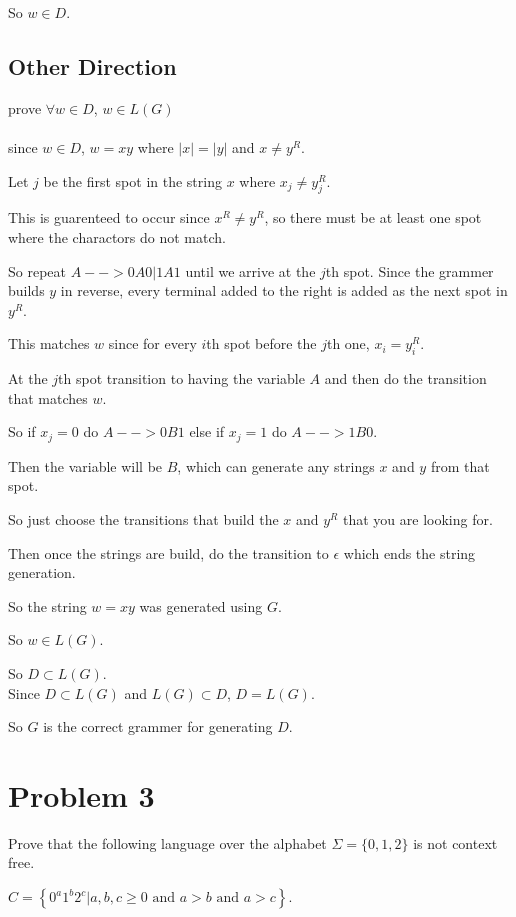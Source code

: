 \documentclass[letterpaper, 11pt]{article}
\begin{document}
So $w \in D$.
\subsection*{Other Direction}
prove $\forall w \in D$, $w \in L(G)$\\\\

since $w \in D$, $w = xy$ where $|x| = |y|$ and $x \neq y^R$.

Let $j$ be the first spot in the string $x$ where $x_j \neq y^R_j$.

This is guarenteed to occur since $x^R \neq y^R$, so there must be at least one spot where the charactors do not match.

So repeat $A --> 0A0|1A1$ until we arrive at the $j$th spot.
Since the grammer builds $y$ in reverse, every terminal added to the right is added as the next spot in $y^R$.

This matches $w$ since for every $i$th spot before the $j$th one, $x_i = y^R_i$.

At the $j$th spot transition to having the variable $A$ and then do the transition that matches $w$.

So if $x_j = 0$ do $A --> 0B1$ else if $x_j = 1$ do $A --> 1B0$.

Then the variable will be $B$, which can generate any strings $x$ and $y$ from that spot.

So just choose the transitions that build the $x$ and $y^R$ that you are looking for.

Then once the strings are build, do the transition to $\epsilon$ which ends the string generation.

So the string $w = xy$ was generated using $G$.

So $w \in L(G)$.

So $D \subset L(G)$.\\

Since $D \subset L(G)$ and $L(G) \subset D$, $D = L(G)$.

So $G$ is the correct grammer for generating $D$.
\newpage
\section*{Problem 3}
Prove that the following language over the alphabet $\Sigma = \{ 0,1,2 \}$ is not context free.
 
$C = \left\{ 0 ^ { a } 1 ^ { b } 2 ^ { c } | a , b , c \geq 0 \text { and } a > b \text { and } a > c \right\}$.\\
 
\end{document}
